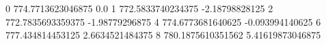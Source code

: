 0 774.7713623046875 0.0
1 772.5833740234375 -2.18798828125
2 772.7835693359375 -1.98779296875
4 774.6773681640625 -0.093994140625
6 777.434814453125 2.6634521484375
8 780.1875610351562 5.41619873046875
